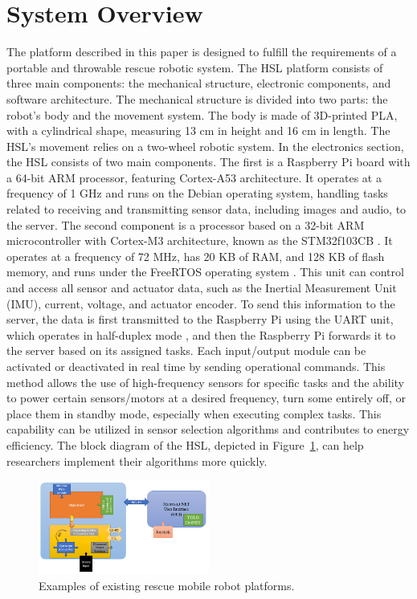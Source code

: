 \documentclass[conference]{IEEEtran}
\begin{document}
\section{System Overview}
The platform described in this paper is designed to fulfill the requirements of a portable and throwable rescue robotic system. The HSL platform consists of three main components: the mechanical structure, electronic components, and software architecture. The mechanical structure is divided into two parts: the robot's body and the movement system. The body is made of 3D-printed PLA, with a cylindrical shape, measuring 13 cm in height and 16 cm in length. The HSL's movement relies on a two-wheel robotic system. In the electronics section, the HSL consists of two main components. The first is a Raspberry Pi board with a 64-bit ARM processor, featuring Cortex-A53 architecture. It operates at a frequency of 1 GHz and runs on the Debian operating system, handling tasks related to receiving and transmitting sensor data, including images and audio, to the server. The second component is a processor based on a 32-bit ARM microcontroller with Cortex-M3 architecture, known as the STM32f103CB \cite{CarmineNoviello2022}. It operates at a frequency of 72 MHz, has 20 KB of RAM, and 128 KB of flash memory, and runs under the FreeRTOS operating system \cite{GUAN201619}. This unit can control and access all sensor and actuator data, such as the Inertial Measurement Unit (IMU), current, voltage, and actuator encoder. To send this information to the server, the data is first transmitted to the Raspberry Pi using the UART unit, which operates in half-duplex mode \cite{teimouri2018mrl}, and then the Raspberry Pi forwards it to the server based on its assigned tasks. Each input/output module can be activated or deactivated in real time by sending operational commands. This method allows the use of high-frequency sensors for specific tasks and the ability to power certain sensors/motors at a desired frequency, turn some entirely off, or place them in standby mode, especially when executing complex tasks. This capability can be utilized in sensor selection algorithms and contributes to energy efficiency. The block diagram of the HSL, depicted in Figure~\ref{Fig_BlockDiagram}, can help researchers implement their algorithms more quickly.

\begin{figure}[htbp] 
    \centerline{\includegraphics[width=0.5\textwidth]{BlockDiagram.PNG}} 
    \caption{Examples of existing rescue mobile robot platforms.} 
    \label{Fig_BlockDiagram}
\end{figure}
\end{document}
